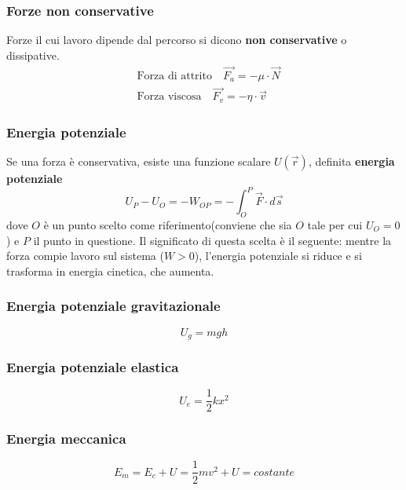 \documentclass[twoside]{article}
\begin{document}
\subsubsection{Forze non conservative}
Forze il cui lavoro dipende dal percorso si dicono \textbf{non conservative} o dissipative.
\begin{align*}
   & \text{Forza di attrito} \quad \vec{F_a} = -\mu \cdot \vec{N} \\
   & \text{Forza viscosa} \quad \vec{F_v} = -\eta \cdot \vec{v}
\end{align*}
\subsubsection{Energia potenziale}
Se una forza è conservativa, esiste una funzione scalare $U(\vec{r})$, definita \textbf{energia potenziale}
\begin{equation}
  \boxed{U_P - U_O = - W_{OP} = -\int_{O}^{P} \vec{F} \cdot d\vec{s}}
\end{equation}
dove $O$ è un punto scelto come riferimento(conviene che sia $O$ tale per cui $U_O=0$) e $P$ il punto in questione.
Il significato di questa scelta è il seguente: mentre la forza compie lavoro sul sistema ($W>0$), l’energia potenziale si riduce e si trasforma in energia cinetica, che aumenta.
\subsubsection{Energia potenziale gravitazionale}
\begin{equation}
  \boxed{U_g = mgh}
\end{equation}
\subsubsection{Energia potenziale elastica}
\begin{equation}
  \boxed{U_e = \frac{1}{2}kx^2}
\end{equation}
\subsubsection{Energia meccanica}
\begin{equation}
  \boxed{E_m = E_c + U = \frac{1}{2}  m  v^2 + U = costante}
\end{equation}
\end{document}
